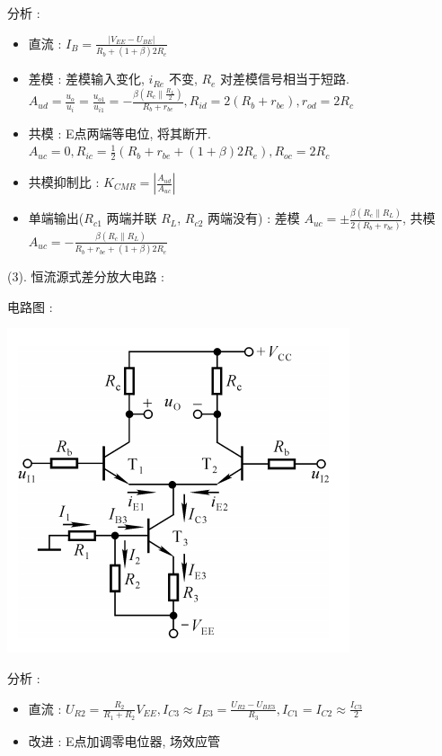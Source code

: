\documentclass[UTF8, 12pt]{ctexart}
\begin{document}
	分析 :
	\begin{itemize}[leftmargin = 4em]
		\item 直流 : $ I_{B} = \frac{|V_{EE}-U_{BE}|}{R_{b}+(1+\beta)2R_{e}} $
		\item 差模 : 差模输入变化, $ i_{Re} $ 不变, $ R_{e} $ 对差模信号相当于短路. $ A_{ud} = \frac{u_{o}}{u_{i}} = \frac{u_{o1}}{u_{i1}} = -\frac{\beta(R_{c} \parallel \frac{R_{L}}{2})}{R_{b}+r_{be}}, R_{id} = 2(R_{b}+r_{be}), r_{od} = 2R_{c} $
		\item 共模 : E点两端等电位, 将其断开. $ A_{uc} = 0, R_{ic} = \frac{1}{2}(R_{b}+r_{be}+(1+\beta)2R_{e}), R_{oc} = 2R_{c} $
		\item 共模抑制比 : $ K_{CMR} = |\frac{A_{ud}}{A_{uc}}| $
		\item 单端输出($ R_{c1} $ 两端并联 $ R_{L} $, $ R_{c2} $ 两端没有) : 差模 $ A_{uc} = \pm \frac{\beta(R_{c} \parallel R_{L})}{2(R_{b}+r_{be})} $, 共模 $ A_{uc} = -\frac{\beta(R_{c} \parallel R_{L})}{R_{b}+r_{be}+(1+\beta)2R_{e}} $ 
	\end{itemize}

	(3). 恒流源式差分放大电路 :

	电路图 :

	\includegraphics[scale = 0.4]{03/恒流源式差分放大电路电路图.png}

	分析 :
	\begin{itemize}[leftmargin = 4em]
		\item 直流 : $ U_{R2} = \frac{R_{2}}{R_{1}+R_{2}}V_{EE}, I_{C3} \approx I_{E3} = \frac{U_{R2}-U_{BE3}}{R_{3}}, I_{C1} = I_{C2} \approx \frac{I_{C3}}{2} $
		\item 改进 : E点加调零电位器, 场效应管
	\end{itemize}
\end{document}
